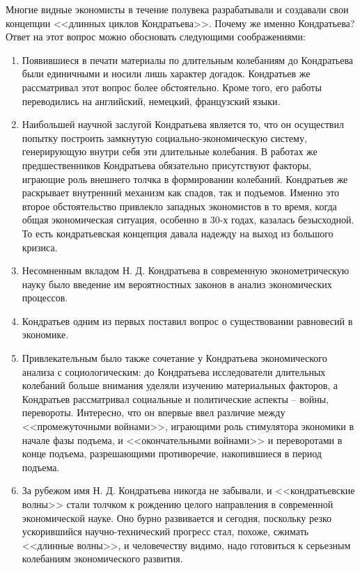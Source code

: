 \documentclass[a4paper,14pt]{extarticle}
\begin{document}
 	Многие видные экономисты в течение полувека разрабатывали и создавали свои концепции <<длинных циклов Кондратьева>>. Почему же именно Кондратьева? Ответ на этот вопрос можно обосновать следующими соображениями:
 	\begin{enumerate}
 		\item Появившиеся в печати материалы по длительным колебаниям до Кондратьева были единичными и носили лишь характер догадок. Кондратьев же рассматривал этот вопрос более обстоятельно. Кроме того, его работы переводились на английский, немецкий, французский языки.
 		\item Наибольшей научной заслугой Кондратьева является то, что он осуществил попытку построить замкнутую социально-экономическую систему, генерирующую внутри себя эти длительные колебания. В работах же предшественников Кондратьева обязательно присутствуют факторы, играющие роль внешнего толчка в формировании колебаний. Кондратьев же раскрывает внутренний механизм как спадов, так и подъемов. Именно это второе обстоятельство привлекло западных экономистов в то время, когда общая экономическая ситуация, особенно в 30-х годах, казалась безысходной. То есть кондратьевская концепция давала надежду на выход из большого кризиса.
 		\item Несомненным вкладом Н. Д. Кондратьева в современную эконометрическую науку было введение им вероятностных законов в анализ экономических процессов.
 		\item Кондратьев одним из первых поставил вопрос о существовании равновесий в экономике.
 		\item Привлекательным было также сочетание у Кондратьева экономического анализа с социологическим: до Кондратьева исследователи длительных колебаний больше внимания уделяли изучению материальных факторов, а Кондратьев рассматривал социальные и политические аспекты – войны, перевороты. Интересно, что он впервые ввел различие между <<промежуточными войнами>>, играющими роль стимулятора экономики в начале фазы подъема, и <<окончательными войнами>> и переворотами в конце подъема, разрешающими противоречие, накопившиеся в период подъема.
 		\item За рубежом имя Н. Д. Кондратьева никогда не забывали, и <<кондратьевские волны>> стали толчком к рождению целого направления в современной экономической науке. Оно бурно развивается и сегодня, поскольку резко ускорившийся научно-технический прогресс стал, похоже, сжимать <<длинные волны>>, и человечеству видимо, надо готовиться к серьезным колебаниям экономического развития.
 	\end{enumerate}
 	
\end{document}
